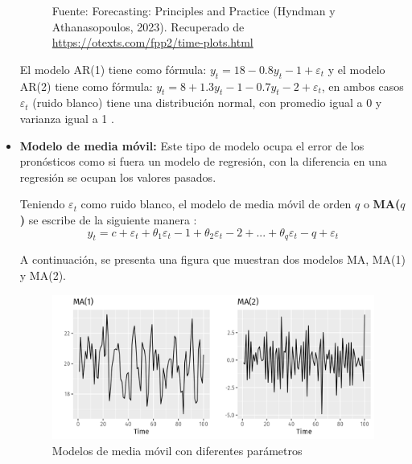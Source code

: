 \begin{itemize}
\begin{figure}[H]
        \begin{minipage}[t]{0.9\textwidth}
            Fuente: Forecasting: Principles and Practice (Hyndman y Athanasopoulos, 2023). Recuperado de \url{https://otexts.com/fpp2/time-plots.html}
        \end{minipage}
    \end{figure}

    El modelo AR(1) tiene como fórmula: $y_t=18-0.8y_t-1+\varepsilon_t$ y el modelo AR(2) tiene como fórmula: $y_t=8+1.3y_t-1 - 0.7y_t-2+\varepsilon_t$, en ambos casos $\varepsilon_t$ (ruido blanco) tiene una distribución normal, con promedio igual a 0 y varianza igual a 1 \cite{forecast-time-series-arima}.

    \item \textbf{Modelo de media móvil:} Este tipo de modelo ocupa el error de los pronósticos como si fuera un modelo de regresión, con la diferencia en una regresión se ocupan los valores pasados. 

    Teniendo $\varepsilon_t$ como ruido blanco, el modelo de media móvil de orden $q$ o \textbf{MA($q$)} se escribe de la siguiente manera \cite{forecast-time-series-arima}:
    \begin{equation*}
        y_t=c+\varepsilon_t+\theta_1\varepsilon_t-1+\theta_2\varepsilon_t-2+...+\theta_q\varepsilon_t-q+\varepsilon_t
    \end{equation*}

    A continuación, se presenta una figura que muestran dos modelos MA, MA(1) y MA(2).

    \begin{figure}[H]
        \begin{minipage}[t]{0.9\textwidth}
            \caption{Modelos de media móvil con diferentes parámetros}
            \label{MAmodel}        
        \end{minipage}
    
        \vspace{10pt}
    
        \begin{minipage}[b]{1.1\textwidth}
            \centering
            \includegraphics[width=\textwidth]{img/maq-1-example.png}        
        \end{minipage}
    

\end{figure}
\end{itemize}
